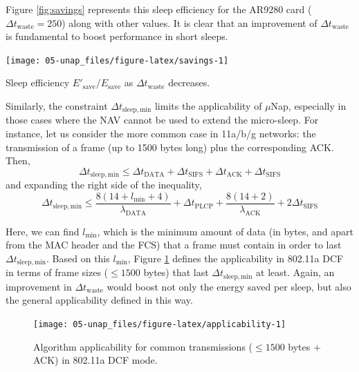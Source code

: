 \documentclass[twoside,nohyper]{tufte-book}
\begin{document}
Figure \ref{fig:savings} represents this sleep efficiency for the AR9280 card (\(\Delta t_\mathrm{waste}=250\)) along with other values. It is clear that an improvement of \(\Delta t_\mathrm{waste}\) is fundamental to boost performance in short sleeps.



\begin{marginfigure}[-6in]

{\centering \texttt{[image: 05-unap\_files/figure-latex/savings-1]} 

}

\caption[Sleep efficiency \(E'_\mathrm{save}/E_\mathrm{save}\) as \(\Delta t_\mathrm{waste}\) decreases.]{Sleep efficiency \(E'_\mathrm{save}/E_\mathrm{save}\) as \(\Delta t_\mathrm{waste}\) decreases.}\label{fig:savings}
\end{marginfigure}

Similarly, the constraint \(\Delta t_\mathrm{sleep,min}\) limits the applicability of \(\mu\)Nap, especially in those cases where the NAV cannot be used to extend the micro-sleep. For instance, let us consider the more common case in 11a/b/g networks: the transmission of a frame (up to 1500 bytes long) plus the corresponding ACK. Then,
%
\begin{equation}
 \Delta t_\mathrm{sleep,min} \le \Delta t_\mathrm{DATA} + \Delta t_\mathrm{SIFS} + \Delta t_\mathrm{ACK} + \Delta t_\mathrm{SIFS} \label{eq:tsleepmin}
\end{equation}
%
and expanding the right side of the inequality,
%
\begin{equation*}
 \Delta t_\mathrm{sleep,min} \le \frac{8(14+l_\mathrm{min}+4)}{\lambda_\mathrm{DATA}} + \Delta t_\mathrm{PLCP} + \frac{8(14+2)}{\lambda_\mathrm{ACK}} + 2\Delta t_\mathrm{SIFS}
\end{equation*}
%


Here, we can find \(l_\mathrm{min}\), which is the minimum amount of data (in bytes, and apart from the MAC header and the FCS) that a frame must contain in order to last \(\Delta t_\mathrm{sleep,min}\). Based on this \(l_\mathrm{min}\), Figure \ref{fig:applicability} defines the applicability in 802.11a DCF in terms of frame sizes (\(\le 1500\) bytes) that last \(\Delta t_\mathrm{sleep,min}\) at least. Again, an improvement in \(\Delta t_\mathrm{waste}\) would boost not only the energy saved per sleep, but also the general applicability defined in this way.



\begin{figure}

{\centering \texttt{[image: 05-unap\_files/figure-latex/applicability-1]} 

}

\caption[Algorithm applicability for common transmissions (\(\le 1500\) bytes \(+\) ACK) in 802.11a DCF mode.]{Algorithm applicability for common transmissions (\(\le 1500\) bytes \(+\) ACK) in 802.11a DCF mode.}\label{fig:applicability}
\end{figure}
\end{document}

